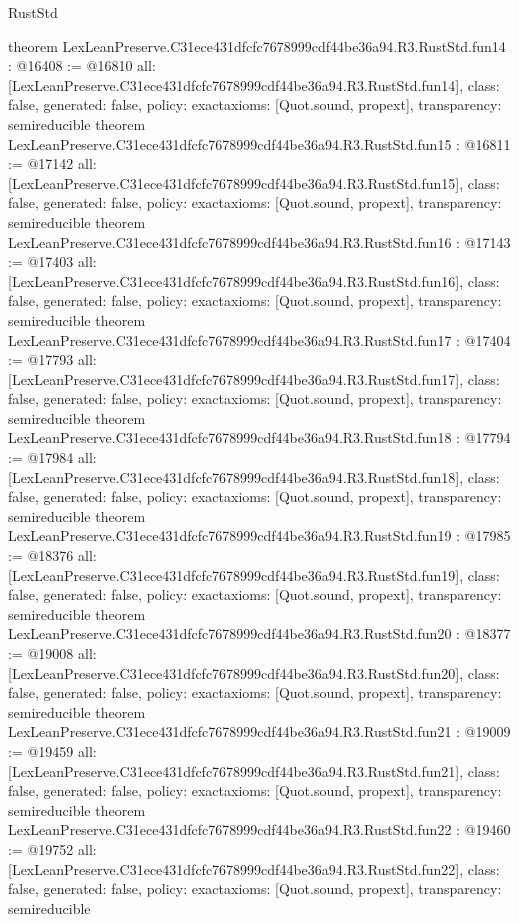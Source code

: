 \begin{lexlean}{RustStd}
\begin{coremodule}
{}
theorem LexLeanPreserve.C31ece431dfcfc7678999cdf44be36a94.R3.RustStd.fun14 : @16408 := @16810 {
  all: [LexLeanPreserve.C31ece431dfcfc7678999cdf44be36a94.R3.RustStd.fun14],
  class: false,
  generated: false,
  policy: exact{axioms: [Quot.sound, propext]},
  transparency: semireducible
}
theorem LexLeanPreserve.C31ece431dfcfc7678999cdf44be36a94.R3.RustStd.fun15 : @16811 := @17142 {
  all: [LexLeanPreserve.C31ece431dfcfc7678999cdf44be36a94.R3.RustStd.fun15],
  class: false,
  generated: false,
  policy: exact{axioms: [Quot.sound, propext]},
  transparency: semireducible
}
theorem LexLeanPreserve.C31ece431dfcfc7678999cdf44be36a94.R3.RustStd.fun16 : @17143 := @17403 {
  all: [LexLeanPreserve.C31ece431dfcfc7678999cdf44be36a94.R3.RustStd.fun16],
  class: false,
  generated: false,
  policy: exact{axioms: [Quot.sound, propext]},
  transparency: semireducible
}
theorem LexLeanPreserve.C31ece431dfcfc7678999cdf44be36a94.R3.RustStd.fun17 : @17404 := @17793 {
  all: [LexLeanPreserve.C31ece431dfcfc7678999cdf44be36a94.R3.RustStd.fun17],
  class: false,
  generated: false,
  policy: exact{axioms: [Quot.sound, propext]},
  transparency: semireducible
}
theorem LexLeanPreserve.C31ece431dfcfc7678999cdf44be36a94.R3.RustStd.fun18 : @17794 := @17984 {
  all: [LexLeanPreserve.C31ece431dfcfc7678999cdf44be36a94.R3.RustStd.fun18],
  class: false,
  generated: false,
  policy: exact{axioms: [Quot.sound, propext]},
  transparency: semireducible
}
theorem LexLeanPreserve.C31ece431dfcfc7678999cdf44be36a94.R3.RustStd.fun19 : @17985 := @18376 {
  all: [LexLeanPreserve.C31ece431dfcfc7678999cdf44be36a94.R3.RustStd.fun19],
  class: false,
  generated: false,
  policy: exact{axioms: [Quot.sound, propext]},
  transparency: semireducible
}
theorem LexLeanPreserve.C31ece431dfcfc7678999cdf44be36a94.R3.RustStd.fun20 : @18377 := @19008 {
  all: [LexLeanPreserve.C31ece431dfcfc7678999cdf44be36a94.R3.RustStd.fun20],
  class: false,
  generated: false,
  policy: exact{axioms: [Quot.sound, propext]},
  transparency: semireducible
}
theorem LexLeanPreserve.C31ece431dfcfc7678999cdf44be36a94.R3.RustStd.fun21 : @19009 := @19459 {
  all: [LexLeanPreserve.C31ece431dfcfc7678999cdf44be36a94.R3.RustStd.fun21],
  class: false,
  generated: false,
  policy: exact{axioms: [Quot.sound, propext]},
  transparency: semireducible
}
theorem LexLeanPreserve.C31ece431dfcfc7678999cdf44be36a94.R3.RustStd.fun22 : @19460 := @19752 {
  all: [LexLeanPreserve.C31ece431dfcfc7678999cdf44be36a94.R3.RustStd.fun22],
  class: false,
  generated: false,
  policy: exact{axioms: [Quot.sound, propext]},
  transparency: semireducible
}
\end{coremodule}
\end{lexlean}
